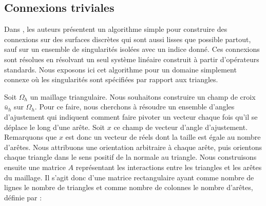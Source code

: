 \subsection{Connexions triviales}

Dans \cite{crane2010trivial}, les auteurs présentent un algorithme simple pour construire des connexions sur des surfaces discrètes qui sont aussi lisses que possible partout, sauf sur un ensemble de singularités isolées avec un indice donné. Ces connexions sont résolues en résolvant un seul système linéaire construit à partir d'opérateurs standards. Nous exposons ici cet algorithme pour un domaine simplement connexe où les singularités sont spécifiées par rapport aux triangles.

Soit $\Omega_h$ un maillage triangulaire. Nous souhaitons construire un champ de croix $\bar{u}_h$ sur $\Omega_h$. Pour ce faire, nous cherchons à résoudre un ensemble d'angles d'ajustement qui indiquent comment faire pivoter un vecteur chaque fois qu'il se déplace le long d'une arête. Soit $x$ ce champ de vecteur d'angle d'ajustement. Remarquons que $x$ est donc un vecteur de réels dont la taille est égale au nombre d'arêtes. Nous attribuons une orientation arbitraire à chaque arête, puis orientons chaque triangle dans le sens positif de la normale au triangle. Nous construisons ensuite une matrice $A$ représentant les interactions entre les triangles et les arêtes du maillage. Il s'agit donc d'une matrice rectangulaire ayant comme nombre de lignes le nombre de triangles et comme nombre de colonnes le nombre d'arêtes, définie par :

